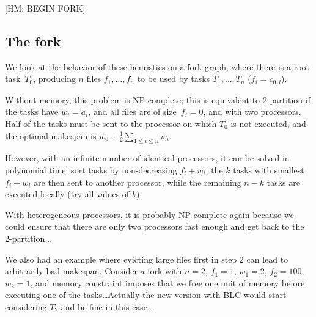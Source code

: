 \documentclass[conference]{IEEEtran}
\newcommand{\hmey}[1]{{\color{red}[HM: #1]}}
\begin{document}
\hmey{BEGIN FORK}
    \subsection{The fork}
    We look at the behavior of these heuristics on a fork graph,
    where there is a root task~$T_0$, producing $n$ files $f_1, \ldots, f_n$
    to be used by tasks $T_1, \ldots, T_n$ ($f_i = c_{0,i}$).

    Without memory, this problem is NP-complete; this is equivalent
    to 2-partition if the tasks have $w_i=a_i$, and all files are of size~$f_i=0$,
    and with two processors. Half of the tasks must be sent to the processor
    on which $T_0$ is not executed, and the optimal makespan is
    $w_0+\frac{1}{2}\sum_{1\leq i \leq n} w_i$.

    However, with an infinite number of identical processors, it can be
    solved in polynomial time: sort tasks by non-decreasing $f_i+w_i$;
    the $k$ tasks with smallest $f_i+w_i$ are then sent to another processor,
    while the remaining $n-k$ tasks are executed locally (try all values of $k$).

    With heterogeneous processors, it is probably NP-complete again
    because we could ensure that there are only two processors fast enough
    and get back to the 2-partition...

    We also had an example where evicting large files first in step 2
    can lead to arbitrarily bad makespan. Consider a fork with $n=2$,
    $f_1=1$, $w_1=2$, $f_2=100$, $w_2=1$, and memory constraint
    imposes that we free one unit of memory before executing one
    of the tasks\ldots Actually the new version with BLC would start
    considering $T_2$ and be fine in this case\ldots
\end{document}
